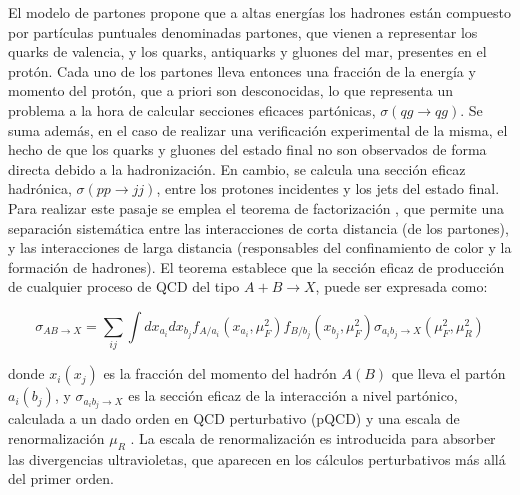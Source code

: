 El modelo de partones propone que a altas energías los hadrones están compuesto por partículas puntuales denominadas partones, que vienen a representar los quarks de valencia, y los quarks, antiquarks y gluones del mar, presentes en el protón. Cada uno de los partones lleva entonces una fracción de la energía y momento del protón, que a priori son desconocidas, lo que representa un problema a la hora de calcular secciones eficaces partónicas, $\sigma(qg\to qg)$.
Se suma además, en el caso de realizar una verificación experimental de la misma, el hecho de que los quarks y gluones del estado final no son observados de forma directa debido a la hadronización. En cambio, se calcula una sección eficaz hadrónica, $\sigma(pp\to jj)$, entre los protones incidentes y los jets del estado final. Para realizar este pasaje se emplea el teorema de factorización \cite{ELLIS1978281}, que permite una separación sistemática
entre las interacciones de corta distancia (de los partones), y las interacciones de larga distancia (responsables del confinamiento de color y la formación de hadrones). El teorema establece que la sección eficaz de producción de cualquier proceso de QCD del tipo $A+B\to X$, puede ser expresada como:


\begin{equation}
	\sigma_{AB\to X} = \sum_{ij} \int dx_{a_i} dx_{b_j} f_{A/a_i}(x_{a_i}, \mu_{F}^2) f_{B/b_j}(x_{b_j}, \mu_{F}^2) \sigma_{a_i b_j \to X}(\mu_{F}^2, \mu_{R}^2)
	\label{eq:xs_fact}
\end{equation}

\noindent
donde $x_i(x_j)$ es la fracción del momento del hadrón $A(B)$ que lleva el partón $a_i(b_j)$, y $\sigma_{a_i b_j \to X}$ es la sección eficaz de la interacción a nivel partónico, calculada a un dado orden en QCD perturbativo (pQCD) y una escala de renormalización $\mu_R$ \cite{Tripiana:1433788,Wahlberg:2005gi}. La escala de renormalización es introducida
para absorber las divergencias ultravioletas, que aparecen en los cálculos perturbativos más
allá del primer orden.

